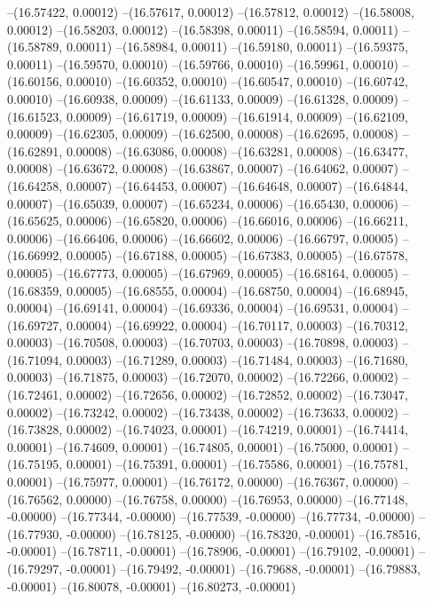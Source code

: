 --(16.57422, 0.00012)
--(16.57617, 0.00012)
--(16.57812, 0.00012)
--(16.58008, 0.00012)
--(16.58203, 0.00012)
--(16.58398, 0.00011)
--(16.58594, 0.00011)
--(16.58789, 0.00011)
--(16.58984, 0.00011)
--(16.59180, 0.00011)
--(16.59375, 0.00011)
--(16.59570, 0.00010)
--(16.59766, 0.00010)
--(16.59961, 0.00010)
--(16.60156, 0.00010)
--(16.60352, 0.00010)
--(16.60547, 0.00010)
--(16.60742, 0.00010)
--(16.60938, 0.00009)
--(16.61133, 0.00009)
--(16.61328, 0.00009)
--(16.61523, 0.00009)
--(16.61719, 0.00009)
--(16.61914, 0.00009)
--(16.62109, 0.00009)
--(16.62305, 0.00009)
--(16.62500, 0.00008)
--(16.62695, 0.00008)
--(16.62891, 0.00008)
--(16.63086, 0.00008)
--(16.63281, 0.00008)
--(16.63477, 0.00008)
--(16.63672, 0.00008)
--(16.63867, 0.00007)
--(16.64062, 0.00007)
--(16.64258, 0.00007)
--(16.64453, 0.00007)
--(16.64648, 0.00007)
--(16.64844, 0.00007)
--(16.65039, 0.00007)
--(16.65234, 0.00006)
--(16.65430, 0.00006)
--(16.65625, 0.00006)
--(16.65820, 0.00006)
--(16.66016, 0.00006)
--(16.66211, 0.00006)
--(16.66406, 0.00006)
--(16.66602, 0.00006)
--(16.66797, 0.00005)
--(16.66992, 0.00005)
--(16.67188, 0.00005)
--(16.67383, 0.00005)
--(16.67578, 0.00005)
--(16.67773, 0.00005)
--(16.67969, 0.00005)
--(16.68164, 0.00005)
--(16.68359, 0.00005)
--(16.68555, 0.00004)
--(16.68750, 0.00004)
--(16.68945, 0.00004)
--(16.69141, 0.00004)
--(16.69336, 0.00004)
--(16.69531, 0.00004)
--(16.69727, 0.00004)
--(16.69922, 0.00004)
--(16.70117, 0.00003)
--(16.70312, 0.00003)
--(16.70508, 0.00003)
--(16.70703, 0.00003)
--(16.70898, 0.00003)
--(16.71094, 0.00003)
--(16.71289, 0.00003)
--(16.71484, 0.00003)
--(16.71680, 0.00003)
--(16.71875, 0.00003)
--(16.72070, 0.00002)
--(16.72266, 0.00002)
--(16.72461, 0.00002)
--(16.72656, 0.00002)
--(16.72852, 0.00002)
--(16.73047, 0.00002)
--(16.73242, 0.00002)
--(16.73438, 0.00002)
--(16.73633, 0.00002)
--(16.73828, 0.00002)
--(16.74023, 0.00001)
--(16.74219, 0.00001)
--(16.74414, 0.00001)
--(16.74609, 0.00001)
--(16.74805, 0.00001)
--(16.75000, 0.00001)
--(16.75195, 0.00001)
--(16.75391, 0.00001)
--(16.75586, 0.00001)
--(16.75781, 0.00001)
--(16.75977, 0.00001)
--(16.76172, 0.00000)
--(16.76367, 0.00000)
--(16.76562, 0.00000)
--(16.76758, 0.00000)
--(16.76953, 0.00000)
--(16.77148, -0.00000)
--(16.77344, -0.00000)
--(16.77539, -0.00000)
--(16.77734, -0.00000)
--(16.77930, -0.00000)
--(16.78125, -0.00000)
--(16.78320, -0.00001)
--(16.78516, -0.00001)
--(16.78711, -0.00001)
--(16.78906, -0.00001)
--(16.79102, -0.00001)
--(16.79297, -0.00001)
--(16.79492, -0.00001)
--(16.79688, -0.00001)
--(16.79883, -0.00001)
--(16.80078, -0.00001)
--(16.80273, -0.00001)
